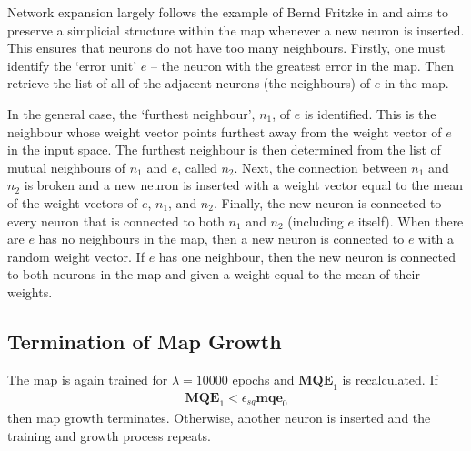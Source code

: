 \documentclass{article}
\begin{document}
Network expansion largely follows the example of Bernd Fritzke in \cite{fritzke1994growing} and aims to preserve a simplicial structure within the map whenever a new neuron is inserted. 
This ensures that neurons do not have too many neighbours. 
Firstly, one must identify the `error unit' $e$ -- the neuron with the greatest error in the map. 
Then retrieve the list of all of the adjacent neurons (the neighbours) of $e$ in the map.

%

In the general case, the `furthest neighbour', $n_1$, of $e$ is identified. 
This is the neighbour whose weight vector points furthest away from the weight vector of $e$ in the input space. 
The furthest neighbour is then determined from the list of mutual neighbours of $n_1$ and $e$, called $n_2$. 
Next, the connection between $n_1$ and $n_2$ is broken and a new neuron is inserted with a weight vector equal to the mean of the weight vectors of $e$, $n_1$, and $n_2$. 
Finally, the new neuron is connected to every neuron that is connected to both $n_1$ and $n_2$ (including $e$ itself).
When there are $e$ has no neighbours in the map, then a new neuron is connected to $e$ with a random weight vector.
If $e$ has one neighbour, then the new neuron is connected to both neurons in the map and given a weight equal to the mean of their weights.

\subsection{Termination of Map Growth}
The map is again trained for $\lambda=10000$ epochs and $\textbf{MQE}_1$ is recalculated. If
\begin{align}
\textbf{MQE}_1 < \epsilon_{sg} \textbf{mqe}_0
\end{align}
then map growth terminates. 
Otherwise, another neuron is inserted and the training and growth process repeats.
\end{document}
